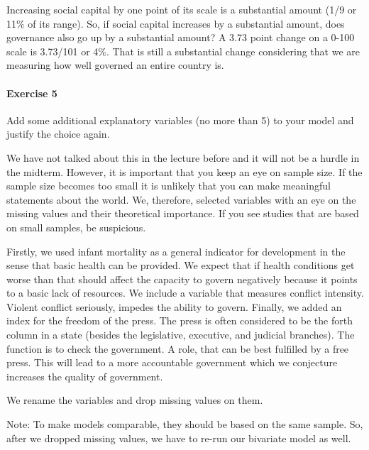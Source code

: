 \documentclass[]{article}
\let\oldparagraph\paragraph
\renewcommand{\paragraph}[1]{\oldparagraph{#1}\mbox{}}
\theoremstyle{definition}
\theoremstyle{definition}
\theoremstyle{definition}
\theoremstyle{remark}
\begin{document}
Increasing social capital by one point of its scale is a substantial
amount (1/9 or 11\(\%\) of its range). So, if social capital increases
by a substantial amount, does governance also go up by a substantial
amount? A 3.73 point change on a 0-100 scale is 3.73/101 or 4\(\%\).
That is still a substantial change considering that we are measuring how
well governed an entire country is.

\paragraph{Exercise 5}\label{exercise-5-6}

Add some additional explanatory variables (no more than 5) to your model
and justify the choice again.

We have not talked about this in the lecture before and it will not be a
hurdle in the midterm. However, it is important that you keep an eye on
sample size. If the sample size becomes too small it is unlikely that
you can make meaningful statements about the world. We, therefore,
selected variables with an eye on the missing values and their
theoretical importance. If you see studies that are based on small
samples, be suspicious.

Firstly, we used infant mortality as a general indicator for development
in the sense that basic health can be provided. We expect that if health
conditions get worse than that should affect the capacity to govern
negatively because it points to a basic lack of resources. We include a
variable that measures conflict intensity. Violent conflict seriously,
impedes the ability to govern. Finally, we added an index for the
freedom of the press. The press is often considered to be the forth
column in a state (besides the legislative, executive, and judicial
branches). The function is to check the government. A role, that can be
best fulfilled by a free press. This will lead to a more accountable
government which we conjecture increases the quality of government.

We rename the variables and drop missing values on them.

Note: To make models comparable, they should be based on the same
sample. So, after we dropped missing values, we have to re-run our
bivariate model as well.
\end{document}

